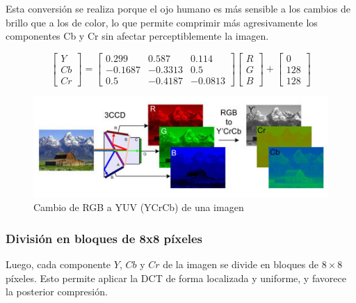 \documentclass[8pt,a4paper]{article}
\theoremstyle{definition}
\theoremstyle{remark}
\begin{document}
\begin{multicols}{2}
            Esta conversión se realiza porque el ojo humano es más sensible a los cambios de brillo que a los de color, lo que permite comprimir más agresivamente los componentes Cb y Cr sin afectar perceptiblemente la imagen.
            
            \[
            \begin{bmatrix}
            Y\\
            Cb\\
            Cr
            \end{bmatrix}
            =
            \begin{bmatrix}
            0.299&0.587&0.114\\
            -0.1687&-0.3313&0.5\\
            0.5&-0.4187&-0.0813
            \end{bmatrix}
            \begin{bmatrix}
            R \\
            G \\
            B
            \end{bmatrix}
            +
            \begin{bmatrix}
            0 \\
            128 \\
            128
            \end{bmatrix}
            \]
            \begin{figure}[H]
                \centering
                \includegraphics[width=0.95\linewidth]{rgbchange.jpg}
                \captionsetup{skip=2pt}
                \caption*{Cambio de RGB a YUV (YCrCb) de una imagen}
            \end{figure}
            \subsubsection{División en bloques de 8x8 píxeles}
            
            Luego, cada componente \( Y \), \( Cb \) y \( Cr \) de la imagen se divide en bloques de \( 8 \times 8 \) píxeles. Esto permite aplicar la DCT de forma localizada y uniforme, y favorece la posterior compresión.
            

\end{multicols}
\end{document}
